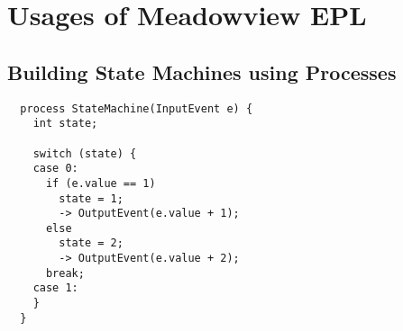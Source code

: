 \documentclass{pamsbook}
\begin{document}
\section{Usages of Meadowview EPL}
\subsection{Building State Machines using Processes}
{\small
\begin{verbatim}
  process StateMachine(InputEvent e) {
    int state;
  
    switch (state) {
    case 0:
      if (e.value == 1)
        state = 1;
        -> OutputEvent(e.value + 1);
      else
        state = 2;
        -> OutputEvent(e.value + 2);
      break;
    case 1:
    }
  }
\end{verbatim}
}
\end{document}
